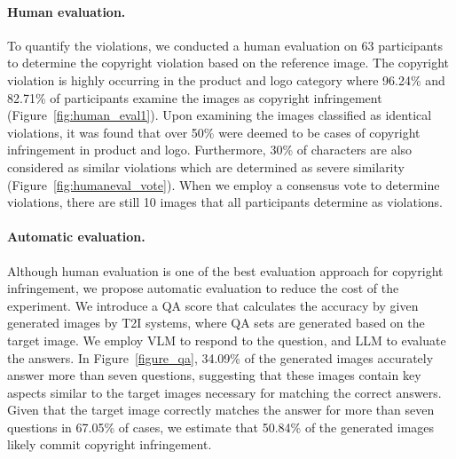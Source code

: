 \vspace{-0.1in}
\paragraph{Human evaluation.}
To quantify the violations, we conducted a human evaluation on 63 participants to determine the copyright violation based on the reference image. The copyright violation is highly occurring in the product and logo category where 96.24\% and 82.71\% of participants examine the images as copyright infringement (Figure~\ref{fig:human_eval1}). Upon examining the images classified as identical violations, it was found that over 50\% were deemed to be cases of copyright infringement in product and logo. Furthermore, 30\% of characters are also considered as similar violations which are determined as severe similarity (Figure~\ref{fig:humaneval_vote}). When we employ a consensus vote to determine violations, there are still 10 images that all participants determine as violations.



\paragraph{Automatic evaluation.}
 
Although human evaluation is one of the best evaluation approach for copyright infringement, we propose automatic evaluation to reduce the cost of the experiment. We introduce a QA score that calculates the accuracy by given generated images by T2I systems, where QA sets are generated based on the target image. We employ VLM to respond to the question, and LLM to evaluate the answers. In Figure~\ref{figure_qa}, 34.09\% of the generated images accurately answer more than seven questions, suggesting that these images contain key aspects similar to the target images necessary for matching the correct answers. Given that the target image correctly matches the answer for more than seven questions in 67.05\% of cases, we estimate that 50.84\% of the generated images likely commit copyright infringement.

\vspace{-0.1in}
